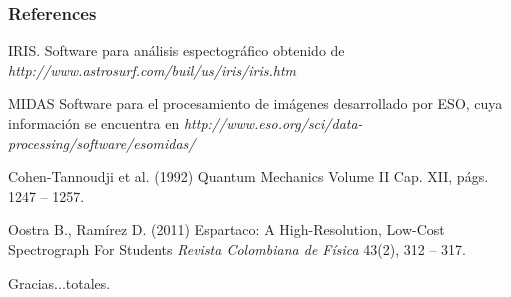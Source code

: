 \documentclass{beamer}
\begin{document}
\begin{frame}
\frametitle{References}
\footnotesize{
\begin{thebibliography}{99} %
 IRIS. 
\newblock Software para análisis espectográfico obtenido de \emph{http://www.astrosurf.com/buil/us/iris/iris.htm}


 MIDAS
\newblock Software para el procesamiento de imágenes desarrollado por ESO, cuya información se encuentra en
\emph{http://www.eso.org/sci/data-processing/software/esomidas/}

 Cohen-Tannoudji et al. (1992)
\newblock Quantum Mechanics Volume II
\newblock Cap. XII, págs. 1247 -- 1257.

 Oostra B., Ramírez D. (2011)
\newblock Espartaco: A High-Resolution, Low-Cost Spectrograph For Students 
\newblock \emph{Revista Colombiana de Física} 43(2), 312 -- 317.
\end{thebibliography}
}
\end{frame}


\begin{frame}
\Huge{\centerline{Gracias...totales.}}
\end{frame}

\end{document}

